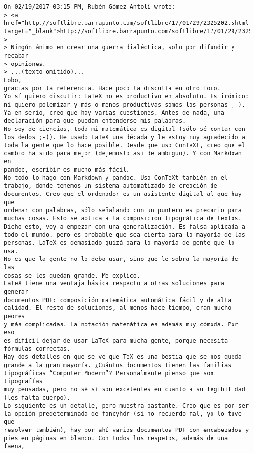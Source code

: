 \documentclass[a4paper,10pt]{article}
\begin{document}
\begin{lstlisting}
On 02/19/2017 03:15 PM, Rubén Gómez Antolí wrote:
> <a href="http://softlibre.barrapunto.com/softlibre/17/01/29/2325202.shtml" target="_blank">http://softlibre.barrapunto.com/softlibre/17/01/29/2325202.shtml</a>
> 
> Ningún ánimo en crear una guerra dialéctica, solo por difundir y recabar
> opiniones.
> ...(texto omitido)...
Lobo,
gracias por la referencia. Hace poco la discutía en otro foro.
Yo sí quiero discutir: LaTeX no es productivo en absoluto. Es irónico:
ni quiero polemizar y más o menos productivas somos las personas ;-).
Ya en serio, creo que hay varias cuestiones. Antes de nada, una
declaración para que puedan entenderse mis palabras.
No soy de ciencias, toda mi matemática es digital (sólo sé contar con
los dedos ;-)). He usado LaTeX una década y le estoy muy agradecido a
toda la gente que lo hace posible. Desde que uso ConTeXt, creo que el
cambio ha sido para mejor (dejémoslo así de ambiguo). Y con Markdown en
pandoc, escribir es mucho más fácil.
No todo lo hago con Markdown y pandoc. Uso ConTeXt también en el
trabajo, donde tenemos un sistema automatizado de creación de
documentos. Creo que el ordenador es un asistente digital al que hay que
ordenar con palabras, sólo señalando con un puntero es precario para
muchas cosas. Esto se aplica a la composición tipográfica de textos.
Dicho esto, voy a empezar con una generalización. Es falsa aplicada a
todo el mundo, pero es probable que sea cierta para la mayoría de las
personas. LaTeX es demasiado quizá para la mayoría de gente que lo usa.
No es que la gente no lo deba usar, sino que le sobra la mayoría de las
cosas se les quedan grande. Me explico.
LaTeX tiene una ventaja básica respecto a otras soluciones para generar
documentos PDF: composición matemática automática fácil y de alta
calidad. El resto de soluciones, al menos hace tiempo, eran mucho peores
y más complicadas. La notación matemática es además muy cómoda. Por eso
es difícil dejar de usar LaTeX para mucha gente, porque necesita
fórmulas correctas.
Hay dos detalles en que se ve que TeX es una bestia que se nos queda
grande a la gran mayoría. ¿Cuántos documentos tienen las familias
tipográficas “Computer Modern”? Personalmente pienso que son tipografías
muy pensadas, pero no sé si son excelentes en cuanto a su legibilidad
(les falta cuerpo).
Lo siguiente es un detalle, pero muestra bastante. Creo que es por ser
la opción predeterminada de fancyhdr (si no recuerdo mal, yo lo tuve que
resolver también), hay por ahí varios documentos PDF con encabezados y
pies en páginas en blanco. Con todos los respetos, además de una faena,

\end{lstlisting}
\end{document}
